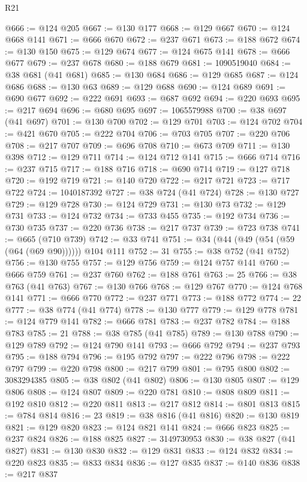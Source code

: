 \begin{lexlean}{R21}
\begin{coremodule}
@666 := @124 @205
@667 := @130 @177
@668 := @129 @667
@670 := @124 @668 @141
@671 := @666 @670
@672 := @237 @671
@673 := @188 @672
@674 := @130 @150
@675 := @129 @674
@677 := @124 @675 @141
@678 := @666 @677
@679 := @237 @678
@680 := @188 @679
@681 := 1090519040
@684 := @38 @681 (@41 @681)
@685 := @130 @684
@686 := @129 @685
@687 := @124 @686
@688 := @130 @63
@689 := @129 @688
@690 := @124 @689
@691 := @690 @677
@692 := @222 @691
@693 := @687 @692
@694 := @220 @693
@695 := @217 @694
@696 := @680 @695
@697 := 1065579988
@700 := @38 @697 (@41 @697)
@701 := @130 @700
@702 := @129 @701
@703 := @124 @702
@704 := @421 @670
@705 := @222 @704
@706 := @703 @705
@707 := @220 @706
@708 := @217 @707
@709 := @696 @708
@710 := @673 @709
@711 := @130 @398
@712 := @129 @711
@714 := @124 @712 @141
@715 := @666 @714
@716 := @237 @715
@717 := @188 @716
@718 := @690 @714
@719 := @127 @718
@720 := @192 @719
@721 := @140 @720
@722 := @217 @721
@723 := @717 @722
@724 := 1040187392
@727 := @38 @724 (@41 @724)
@728 := @130 @727
@729 := @129 @728
@730 := @124 @729
@731 := @130 @73
@732 := @129 @731
@733 := @124 @732
@734 := @733 @455
@735 := @192 @734
@736 := @730 @735
@737 := @220 @736
@738 := @217 @737
@739 := @723 @738
@741 := @665 (@710 @739)
@742 := @33 @741
@751 := @34 (@44 (@49 (@54 (@59 (@64 (@69 @90)))))) @104 @111
@752 := 31
@755 := @38 @752 (@41 @752)
@756 := @130 @755
@757 := @129 @756
@759 := @124 @757 @141
@760 := @666 @759
@761 := @237 @760
@762 := @188 @761
@763 := 25
@766 := @38 @763 (@41 @763)
@767 := @130 @766
@768 := @129 @767
@770 := @124 @768 @141
@771 := @666 @770
@772 := @237 @771
@773 := @188 @772
@774 := 22
@777 := @38 @774 (@41 @774)
@778 := @130 @777
@779 := @129 @778
@781 := @124 @779 @141
@782 := @666 @781
@783 := @237 @782
@784 := @188 @783
@785 := 21
@788 := @38 @785 (@41 @785)
@789 := @130 @788
@790 := @129 @789
@792 := @124 @790 @141
@793 := @666 @792
@794 := @237 @793
@795 := @188 @794
@796 := @195 @792
@797 := @222 @796
@798 := @222 @797
@799 := @220 @798
@800 := @217 @799
@801 := @795 @800
@802 := 3083294385
@805 := @38 @802 (@41 @802)
@806 := @130 @805
@807 := @129 @806
@808 := @124 @807
@809 := @220 @781
@810 := @808 @809
@811 := @192 @810
@812 := @220 @811
@813 := @217 @812
@814 := @801 @813
@815 := @784 @814
@816 := 23
@819 := @38 @816 (@41 @816)
@820 := @130 @819
@821 := @129 @820
@823 := @124 @821 @141
@824 := @666 @823
@825 := @237 @824
@826 := @188 @825
@827 := 3149730953
@830 := @38 @827 (@41 @827)
@831 := @130 @830
@832 := @129 @831
@833 := @124 @832
@834 := @220 @823
@835 := @833 @834
@836 := @127 @835
@837 := @140 @836
@838 := @217 @837

\end{coremodule}
\end{lexlean}
